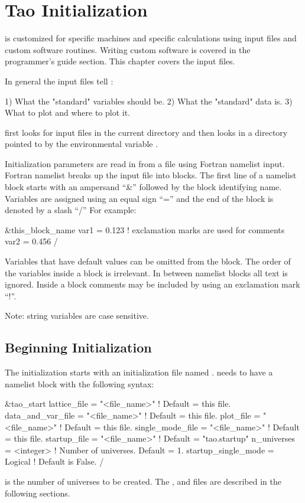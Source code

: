 \chapter{Tao Initialization}
\label{c:init}

\tao is customized for specific machines and specific calculations
using input files and custom software routines. Writing custom software is
covered in the programmer's guide section. This chapter covers the
input files. 

In general the input files tell \tao:
\begin{example}
  1) What the "standard" variables should be.
  2) What the "standard" data is.
  3) What to plot and where to plot it.
\end{example}

\tao first looks for input files in the current directory and then
looks in a directory pointed to by the environmental variable
.

Initialization parameters are read in from a file using Fortran
namelist input. Fortran namelist breaks up the input file into
blocks. The first line of a namelist block starts with an ampersand ``\&''
followed by the block identifying name. Variables are assigned using
an equal sign ``='' and the end of the block is denoted by a slash ``/''
For example:
\begin{example}
  \&this_block_name
    var1 = 0.123   ! exclamation marks are used for comments
    var2 = 0.456
  /
\end{example}
Variables that have default values can be omitted from the block.  The
order of the variables inside a block is irrelevant.  In between
namelist blocks all text is ignored. Inside a block comments may be
included by using an exclamation mark ``!''.

Note: string variables are case sensitive.

\section{Beginning Initialization}
\label{s:init_global} 

The initialization starts with an initialization file named . 
 needs to have a  namelist block with the following syntax:
\begin{example}
  \&tao_start
    lattice_file      = "<file_name>"  ! Default = this file.
    data_and_var_file = "<file_name>"  ! Default = this file.
    plot_file         = "<file_name>"  ! Default = this file.
    single_mode_file  = "<file_name>"  ! Default = this file.
    startup_file      = "<file_name>"  ! Default = "tao.startup"
    n_universes       = <integer>            ! Number of universes. Default = 1.
    startup_single_mode = Logical            ! Default is False.
  /
\end{example}
 is the number of universes to be created. The 
, and  files are described in the following sections.

